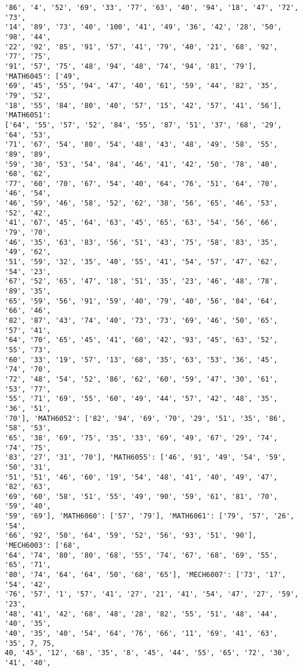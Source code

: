 \documentclass[11pt]{article}
\begin{document}
\begin{Verbatim}[commandchars=\\\{\}]
'86', '4', '52', '69', '33', '77', '63', '40', '94', '18', '47', '72', '73',
'14', '89', '73', '40', '100', '41', '49', '36', '42', '28', '50', '98', '44',
'22', '92', '85', '91', '57', '41', '79', '40', '21', '68', '92', '77', '75',
'91', '57', '75', '48', '94', '48', '74', '94', '81', '79'], 'MATH6045': ['49',
'69', '45', '55', '94', '47', '40', '61', '59', '44', '82', '35', '79', '52',
'18', '55', '84', '80', '40', '57', '15', '42', '57', '41', '56'], 'MATH6051':
['64', '55', '57', '52', '84', '55', '87', '51', '37', '68', '29', '64', '53',
'71', '67', '54', '80', '54', '48', '43', '48', '49', '58', '55', '89', '89',
'59', '30', '53', '54', '84', '46', '41', '42', '50', '78', '40', '68', '62',
'77', '60', '70', '67', '54', '40', '64', '76', '51', '64', '70', '46', '54',
'46', '59', '46', '58', '52', '62', '38', '56', '65', '46', '53', '52', '42',
'41', '67', '45', '64', '63', '45', '65', '63', '54', '56', '66', '79', '70',
'46', '35', '63', '83', '56', '51', '43', '75', '58', '83', '35', '49', '62',
'51', '59', '32', '35', '40', '55', '41', '54', '57', '47', '62', '54', '23',
'67', '52', '65', '47', '18', '51', '35', '23', '46', '48', '78', '89', '35',
'65', '59', '56', '91', '59', '40', '79', '40', '56', '84', '64', '66', '46',
'82', '87', '43', '74', '40', '73', '73', '69', '46', '50', '65', '57', '41',
'64', '70', '65', '45', '41', '60', '42', '93', '45', '63', '52', '55', '73',
'60', '33', '19', '57', '13', '68', '35', '63', '53', '36', '45', '74', '70',
'72', '48', '54', '52', '86', '62', '60', '59', '47', '30', '61', '53', '77',
'55', '71', '69', '55', '60', '49', '44', '57', '42', '48', '35', '36', '51',
'70'], 'MATH6052': ['82', '94', '69', '70', '29', '51', '35', '86', '58', '53',
'65', '38', '69', '75', '35', '33', '69', '49', '67', '29', '74', '74', '75',
'83', '27', '31', '70'], 'MATH6055': ['46', '91', '49', '54', '59', '50', '31',
'51', '51', '46', '60', '19', '54', '48', '41', '40', '49', '47', '82', '63',
'69', '60', '58', '51', '55', '49', '90', '59', '61', '81', '70', '59', '40',
'59', '69'], 'MATH6060': ['57', '79'], 'MATH6061': ['79', '57', '26', '54',
'66', '92', '50', '64', '59', '52', '56', '93', '51', '90'], 'MECH6003': ['68',
'64', '74', '80', '80', '68', '55', '74', '67', '68', '69', '55', '65', '71',
'80', '74', '64', '64', '50', '68', '65'], 'MECH6007': ['73', '17', '54', '42',
'76', '57', '1', '57', '41', '27', '21', '41', '54', '47', '27', '59', '23',
'48', '41', '42', '68', '48', '28', '82', '55', '51', '48', '44', '40', '35',
'40', '35', '40', '54', '64', '76', '66', '11', '69', '41', '63', '35', 7, 75,
40, '45', '12', '68', '35', '8', '45', '44', '55', '65', '72', '30', '41', '40',

\end{Verbatim}
\end{document}
